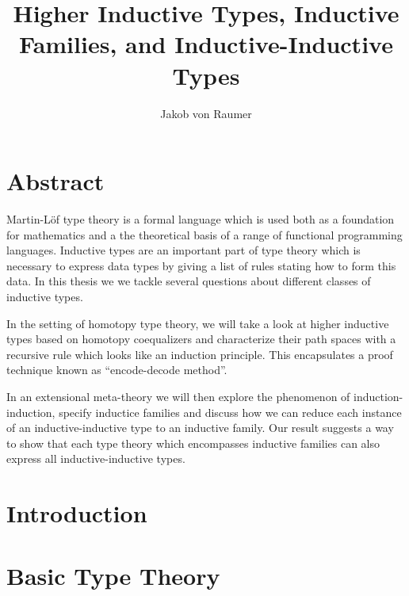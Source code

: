 \documentclass[12pt,headings=optiontohead,openany,oneside,a4paper]{book}
\theoremstyle{definition}
\begin{document}
\title{Higher Inductive Types, Inductive Families, and Inductive-Inductive Types}
\author{Jakob von Raumer}

\frontmatter

\maketitle

\chapter{Abstract}

Martin-Löf type theory is a formal language which is used both as a
foundation for mathematics and a the theoretical basis of a range of
functional programming languages.
Inductive types are an important part of type theory which is necessary to express
data types by giving a list of rules stating how to form this data.
In this thesis we we tackle several questions about different classes of
inductive types.

In the setting of homotopy type theory, we will take a look at higher inductive
types based on homotopy coequalizers and characterize their path spaces with
a recursive rule which looks like an induction principle.
This encapsulates a proof technique known as ``encode-decode method''.

In an extensional meta-theory we will then explore the phenomenon of induction-induction,
specify inductice families and discuss how we can reduce each instance of an
inductive-inductive type to an inductive family.
Our result suggests a way to show that each type theory which encompasses
inductive families can also express all inductive-inductive types.

\tableofcontents

\mainmatter

\chapter{Introduction}\label{chp:intro}



\chapter{Basic Type Theory}\label{chp:tt}
\end{document}
